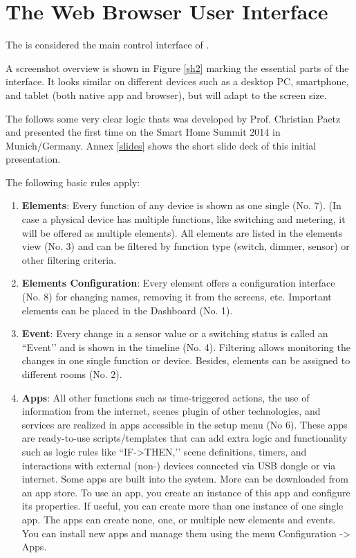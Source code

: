 \chapter{The Web Browser User Interface}
\label{shui}
The \zwshui is considered the main control interface of \zway. 

A screenshot overview is shown in Figure \ref{sh2} marking the essential parts of 
the interface.  It looks similar on different devices 
such as a desktop PC, smartphone, and tablet (both native app and browser), but will 
adapt to the screen size. 

The \zwshui follows some very clear logic thats was developed by Prof. Christian 
Paetz and presented the first time on the Smart Home Summit 2014 in Munich/Germany.
Annex \ref{slides} shows the short slide deck of this initial presentation.

The following basic rules apply:


\begin{enumerate}

\item \textbf{Elements}: Every function of any device is shown as one single (No. 7). (In case a 
physical device has multiple functions, like switching and metering, it will be offered 
as multiple elements). All elements are listed in the elements view (No. 3) and can be 
filtered by function 
type (switch, dimmer, sensor) or other filtering criteria.

\item \textbf{Elements Configuration}: Every element offers a configuration interface (No. 8) for changing names, removing 
it from the screens, etc. Important elements can be placed in the Dashboard (No. 1). 

\item \textbf{Event}: Every change in a sensor value or a switching status is called an 
``Event’’ and is shown  in the timeline (No. 4). Filtering allows monitoring the changes in one single function 
or device. Besides, elements can be assigned to different rooms (No. 2).


\item \textbf{Apps}: All other functions such as time-triggered actions, the use of information from the 
internet, scenes plugin of other technologies, and services are realized in apps accessible 
in the setup menu (No 6). These apps are ready-to-use scripts/templates that can add extra 
logic and functionality such as logic rules like ``IF->THEN,’’ scene definitions, timers, 
and interactions with external (non-\zwave) devices connected via USB dongle or via 
internet. Some apps are built into the system. More can be downloaded from an app store. 
To use an app, you create an instance of this app and configure its properties. If useful, 
you can create more than one instance of one single app. The apps can create none, one, or 
multiple new elements and events. You can install new apps and manage them using the menu
Configuration -> Apps.

\end{enumerate}

